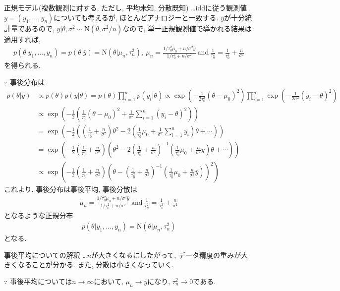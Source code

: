 \documentclass[11pt,a4pape,dvipdfmx]{jarticle}
\newcommand{\eqn}[1]{\begin{align*}#1\end{align*}}
\begin{document}
\begin{itembox}[l]{正規モデル(複数観測に対する, ただし, 平均未知, 分散既知)}
…iddに従う観測値$y=(y_1,\dots,y_n)$についても考えるが, ほとんどアナロジーと一致する.
$\bar{y}$が十分統計量であるので, $\bar{y}|\theta, \sigma^2 \sim \text{N}(\theta,\sigma^2/n)$なので, 単一正規観測値で導かれる結果は適用すれば, 
\eqn{p(\theta|y_1,\dots,y_n)=p(\theta|\bar{y})=\text{N}(\theta|\mu_n,\tau_n^2),\ \mu_n=\tfrac{1/\tau_0^2 \mu_0+n/\sigma^2\bar{y}}{1/\tau_0^2+n/\sigma^2}\ \text{and}\  \tfrac{1}{\tau_n^2}=\tfrac{1}{\tau_0^2}+\tfrac{n}{\sigma^2}}
を得られる.
\end{itembox}
$\because$
事後分布は
\eqn{p(\theta|y)&\propto p(\theta)p(y|\theta)=p(\theta)\prod_{i=1}^n p(y_i|\theta)\propto \exp\left(-\tfrac{1}{2\tau_0^2}(\theta-\mu_0)^2\right) \prod_{i=1}^n \exp\left(-\tfrac{1}{2\sigma^2}(y_i-\theta)^2\right)\\
&\propto \exp\left(-\tfrac{1}{2}  \left( \tfrac{1}{\tau_0^2}(\theta-\mu_0)^2+\tfrac{1}{\sigma^2}\sum_{i=1}^n (y_i-\theta)^2\right)\right)\\
&=\exp\left(-\frac{1}{2}\left( \left(\tfrac{1}{\tau_0^2}+\tfrac{n}{\sigma^2}\right) \theta^2-2\left(\tfrac{1}{\tau_0^2}\mu_0+\tfrac{1}{\sigma^2}\sum_{i=1}^n y_i\right)\theta + \cdots \right) \right)\\
&=\exp\left(-\frac{1}{2}\left(\tfrac{1}{\tau_0^2}+\tfrac{n}{\sigma^2}\right) \left(\theta^2-2\left(\tfrac{1}{\tau_0^2}+\tfrac{n}{\sigma^2}\right)^{-1}\left(\tfrac{1}{\tau_0^2}\mu_0+\tfrac{n}{\sigma^2}\bar{y}\right)\theta + \cdots \right) \right)\\
&\propto\exp\left(-\frac{1}{2}\left(\tfrac{1}{\tau_0^2}+\tfrac{n}{\sigma^2}\right) \left(\theta-\left(\tfrac{1}{\tau_0^2}+\tfrac{n}{\sigma^2}\right)^{-1}\left(\tfrac{1}{\tau_0^2}\mu_0+\tfrac{n}{\sigma^2}\bar{y}\right)\right)^2 \right)}
これより, 事後分布は事後平均, 事後分散は
\eqn{\mu_n=\tfrac{1/\tau_0^2 \mu_0+n/\sigma^2\bar{y}}{1/\tau_0^2+n/\sigma^2}\ \text{and}\  \tfrac{1}{\tau_n^2}=\tfrac{1}{\tau_0^2}+\tfrac{n}{\sigma^2}}
となるような正規分布
\eqn{p(\theta|y_1,\dots,y_n)=\text{N}(\theta|\mu_n,\tau_n^2)}
となる.
 

\begin{itembox}[l]{事後平均についての解釈}
…$n$が大きくなるにしたがって, データ精度の重みが大きくなることが分かる.
また, 分散は小さくなっていく.
\end{itembox}

$\because$
事後平均については$n\rightarrow \infty$において, $\mu_n\rightarrow \bar{y}$になり, $\tau_n^2\rightarrow 0$である.
\end{document}
